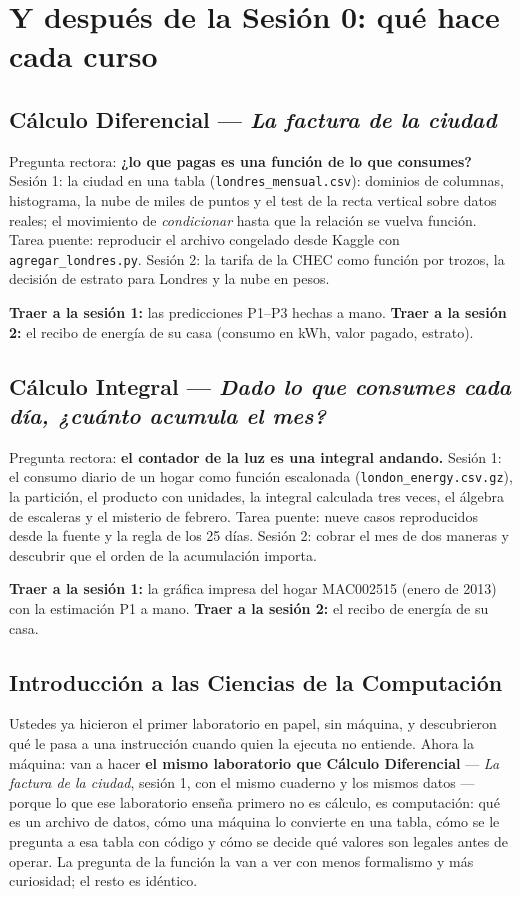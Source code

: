 \documentclass[12pt,letterpaper]{article}
\begin{document}
\section{Y después de la Sesión 0: qué hace cada curso}

\subsection{Cálculo Diferencial --- \emph{La factura de la ciudad}}
Pregunta rectora: \textbf{¿lo que pagas es una función de lo que consumes?} Sesión 1: la ciudad en una tabla (\texttt{londres\_mensual.csv}): dominios de columnas, histograma, la nube de miles de puntos y el test de la recta vertical sobre datos reales; el movimiento de \emph{condicionar} hasta que la relación se vuelva función. Tarea puente: reproducir el archivo congelado desde Kaggle con \texttt{agregar\_londres.py}. Sesión 2: la tarifa de la CHEC como función por trozos, la decisión de estrato para Londres y la nube en pesos.

\textbf{Traer a la sesión 1:} las predicciones P1--P3 hechas a mano. \textbf{Traer a la sesión 2:} el recibo de energía de su casa (consumo en kWh, valor pagado, estrato).

\subsection{Cálculo Integral --- \emph{Dado lo que consumes cada día, ¿cuánto acumula el mes?}}
Pregunta rectora: \textbf{el contador de la luz es una integral andando.} Sesión 1: el consumo diario de un hogar como función escalonada (\texttt{london\_energy.csv.gz}), la partición, el producto con unidades, la integral calculada tres veces, el álgebra de escaleras y el misterio de febrero. Tarea puente: nueve casos reproducidos desde la fuente y la regla de los 25 días. Sesión 2: cobrar el mes de dos maneras y descubrir que el orden de la acumulación importa.

\textbf{Traer a la sesión 1:} la gráfica impresa del hogar MAC002515 (enero de 2013) con la estimación P1 a mano. \textbf{Traer a la sesión 2:} el recibo de energía de su casa.

\subsection{Introducción a las Ciencias de la Computación}
Ustedes ya hicieron el primer laboratorio en papel, sin máquina, y descubrieron qué le pasa a una instrucción cuando quien la ejecuta no entiende. Ahora la máquina: van a hacer \textbf{el mismo laboratorio que Cálculo Diferencial} --- \emph{La factura de la ciudad}, sesión 1, con el mismo cuaderno y los mismos datos --- porque lo que ese laboratorio enseña primero no es cálculo, es computación: qué es un archivo de datos, cómo una máquina lo convierte en una tabla, cómo se le pregunta a esa tabla con código y cómo se decide qué valores son legales antes de operar. La pregunta de la función la van a ver con menos formalismo y más curiosidad; el resto es idéntico.
\end{document}
